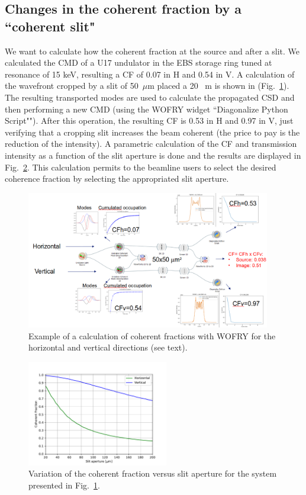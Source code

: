 \documentclass{iopconfser}
\begin{document}
\subsection{Changes in the coherent fraction by a ``coherent slit"}
We want to calculate how the coherent fraction at the source and after a slit. 
We calculated the CMD of a U17 undulator in the EBS storage ring tuned at resonance of 15 keV, resulting a CF of  0.07 in H and 0.54 in V.  A calculation of the wavefront cropped by a slit of 50~$\mu$m placed a 20~ m is shown in (Fig.~\ref{fig:croppingslit}). The resulting transported modes are used to calculate the propagated CSD and then performing a new CMD (using the WOFRY widget ``Diagonalize Python Script""). After this operation, the resulting CF is 0.53 in H and 0.97 in V, just verifying that a cropping slit increases the beam coherent (the price to pay is the reduction of the intensity). A parametric calculation of the CF and transmission intensity as a function of the slit aperture is done and the results are displayed in Fig.~\ref{fig:slitscan}. This calculation permits to the beamline users to select the desired coherence fraction by selecting the appropriated slit aperture. 

\begin{figure}[H]
    \centering
    \includegraphics[width=0.95\textwidth]{figures/croppingslit.png}
    \caption{Example of a calculation of coherent fractions with WOFRY for the horizontal and vertical directions (see text).}\label{fig:croppingslit}
\end{figure}

\begin{figure}
    \centering
    \includegraphics[width=0.55\textwidth]{figures/CFvsGap.pdf}
    \caption{Variation of the coherent fraction versus slit aperture for the system presented in Fig.~\ref{fig:croppingslit}.   }\label{fig:slitscan}
\end{figure}
\end{document}
